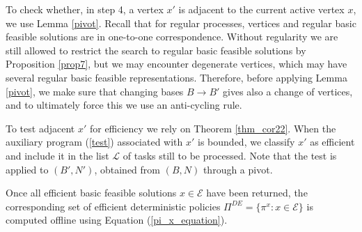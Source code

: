 \documentclass{article}
\newcommand{\possessivecite}[1]{\citeauthor{#1}'s}
\theoremstyle{definition}
\newcounter{step}[algorithm]
\numberwithin{equation}{section}
\begin{document}
To check whether, in step 4, a vertex $x'$ is  adjacent to the current active vertex $x$, we use Lemma 
\ref{pivot}.
Recall that for regular processes, vertices and regular basic feasible solutions are in one-to-one correspondence. Without regularity we are still allowed to restrict the search to regular basic feasible
solutions by Proposition \ref{prop7}, but we may encounter degenerate vertices,
which may have several regular basic feasible representations. 
Therefore,  before applying Lemma \ref{pivot}, we make sure that changing bases
$B \to B'$ gives also  a change of vertices, and to ultimately force 
this we use an anti-cycling rule.

To test adjacent  $x'$ for efficiency 
we rely on Theorem \ref{thm_cor22}. 
When the auxiliary program (\ref{test}) associated with $x'$ is bounded, we classify $x'$ as efficient and include it in the list $\mathscr L$ of tasks still to be processed. Note that the test is applied to $(B',N')$, obtained from $(B,N)$ through a pivot.


Once all efficient basic feasible solutions $x\in \mathscr E$ have been returned, the corresponding 
set of efficient deterministic policies 
$\Pi^{DE}=\{\pi^x: x \in \mathscr E\}$
is computed offline using Equation (\ref{pi_x_equation}).





\end{document}
